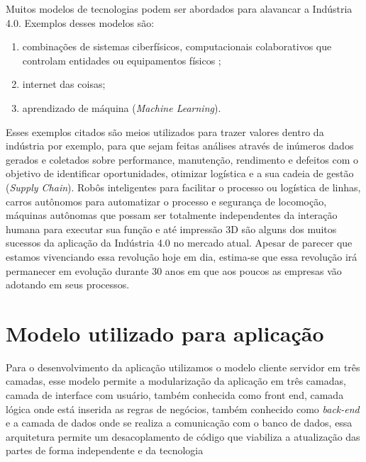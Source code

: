\documentclass[../../layout.tex]{subfiles}
\begin{document}
\hspace*{3em}Muitos modelos de tecnologias podem ser abordados para alavancar a Indústria 4.0. Exemplos desses modelos são:
\begin{enumerate}[label=\alph*)]
\itemsep0em
    \item combinações de sistemas ciberfísicos, computacionais colaborativos que controlam entidades ou equipamentos físicos ;
    \item internet das coisas;
    \item aprendizado de máquina (\emph{Machine Learning}).
\end{enumerate}

\hspace*{3em}Esses exemplos citados são meios utilizados para trazer valores dentro da indústria por exemplo, para que sejam feitas análises através de inúmeros dados gerados e coletados sobre performance, manutenção, rendimento e defeitos com o objetivo de identificar oportunidades, otimizar logística e a sua cadeia de gestão (\emph{Supply Chain}). Robôs inteligentes para facilitar o processo ou logística de linhas, carros autônomos para automatizar o processo e segurança de locomoção, máquinas autônomas que possam ser totalmente independentes da interação humana para executar sua função e até impressão 3D são alguns dos muitos sucessos da aplicação da Indústria 4.0 no mercado atual. Apesar de parecer que estamos vivenciando essa revolução hoje em dia, estima-se que essa revolução irá permanecer em evolução durante 30 anos em que aos poucos as empresas vão adotando em seus processos.

\section{Modelo utilizado para aplicação}
\hspace*{3em}Para o desenvolvimento da aplicação utilizamos o modelo cliente servidor em três camadas, esse modelo permite a modularização da aplicação  em três camadas,  camada de interface com usuário, também conhecida como front end, camada lógica onde está inserida as regras de negócios, também conhecido como \emph{back-end} e a camada de dados  onde se realiza a comunicação com o banco de dados, essa arquitetura permite um desacoplamento de código que viabiliza a atualização das partes de forma independente e da tecnologia \cite{3layers}
\end{document}
